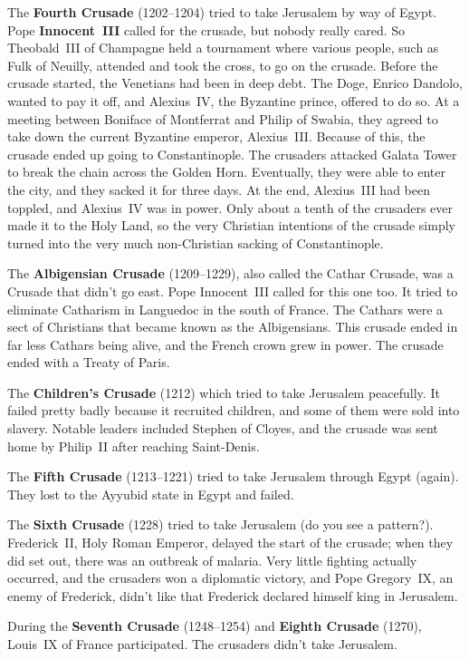 The \textbf{Fourth Crusade} (1202--1204) tried to take Jerusalem by way of Egypt.
Pope \textbf{Innocent~III} called for the crusade, but nobody really cared.
So Theobald~III of Champagne held a tournament where various people, such as Fulk of Neuilly,
attended and took the cross, to go on the crusade.
Before the crusade started, the Venetians had been in deep debt.
The Doge, Enrico Dandolo, wanted to pay it off, and Alexius~IV, the Byzantine prince, offered to do so.
At a meeting between Boniface of Montferrat and Philip of Swabia,
they agreed to take down the current Byzantine emperor, Alexius~III\@.
Because of this, the crusade ended up going to Constantinople.
The crusaders attacked Galata Tower to break the chain across the Golden Horn.
Eventually, they were able to enter the city, and they sacked it for three days.
At the end, Alexius~III had been toppled, and Alexius~IV was in power.
Only about a tenth of the crusaders ever made it to the Holy Land,
so the very Christian intentions of the crusade simply turned into the very much non-Christian sacking of Constantinople.

The \textbf{Albigensian Crusade} (1209--1229), also called the Cathar Crusade, was a Crusade that didn't go east.
Pope Innocent~III called for this one too.
It tried to eliminate Catharism in Languedoc in the south of France.
The Cathars were a sect of Christians that became known as the Albigensians.
This crusade ended in far less Cathars being alive, and the French crown grew in power.
The crusade ended with a Treaty of Paris.

The \textbf{Children's Crusade} (1212) which tried to take Jerusalem peacefully.
It failed pretty badly because it recruited children, and some of them were sold into slavery.
Notable leaders included Stephen of Cloyes, and the crusade was sent home by Philip~II after reaching Saint-Denis.

The \textbf{Fifth Crusade} (1213--1221) tried to take Jerusalem through Egypt (again).
They lost to the Ayyubid state in Egypt and failed.

The \textbf{Sixth Crusade} (1228) tried to take Jerusalem (do you see a pattern?).
Frederick~II, Holy Roman Emperor, delayed the start of the crusade;
when they did set out, there was an outbreak of malaria.
Very little fighting actually occurred, and the crusaders won a diplomatic victory,
and Pope Gregory~IX, an enemy of Frederick, didn't like that Frederick declared himself king in Jerusalem.

During the \textbf{Seventh Crusade} (1248--1254) and \textbf{Eighth Crusade} (1270), Louis~IX of France participated.
The crusaders didn't take Jerusalem.

